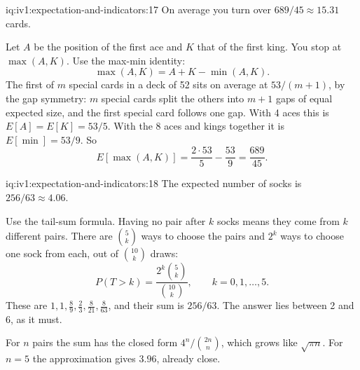 \begin{solution}{iq:iv1:expectation-and-indicators:17}
On average you turn over $689/45 \approx 15.31$ cards.

Let $A$ be the position of the first ace and $K$ that of the first king. You stop at $\max(A, K)$. Use the max-min identity:
\[
\max(A, K) = A + K - \min(A, K).
\]
The first of $m$ special cards in a deck of 52 sits on average at $53/(m+1)$, by the gap symmetry: $m$ special cards split the others into $m+1$ gaps of equal
expected size, and the first special card follows one gap. With 4 aces this is $E[A] = E[K] = 53/5$. With the 8 aces and kings together it is
$E[\min] = 53/9$. So
\[
E[\max(A, K)] = \frac{2 \cdot 53}{5} - \frac{53}{9} = \frac{689}{45}.
\]
\end{solution}

\begin{solution}{iq:iv1:expectation-and-indicators:18}
The expected number of socks is $256/63 \approx 4.06$.

Use the tail-sum formula. Having no pair after $k$ socks means they come from $k$ different pairs. There are $\binom{5}{k}$ ways to choose the pairs and $2^k$ ways
to choose one sock from each, out of $\binom{10}{k}$ draws:
\[
P(T > k) = \frac{2^k \binom{5}{k}}{\binom{10}{k}}, \qquad k = 0, 1, \dots, 5.
\]
These are $1, 1, \tfrac89, \tfrac23, \tfrac{8}{21}, \tfrac{8}{63}$, and their sum is $256/63$. The answer lies between 2 and 6, as it must.

For $n$ pairs the sum has the closed form $4^n / \binom{2n}{n}$, which grows like $\sqrt{\pi n}$. For $n = 5$ the approximation gives $3.96$,
already close.

\end{solution}

